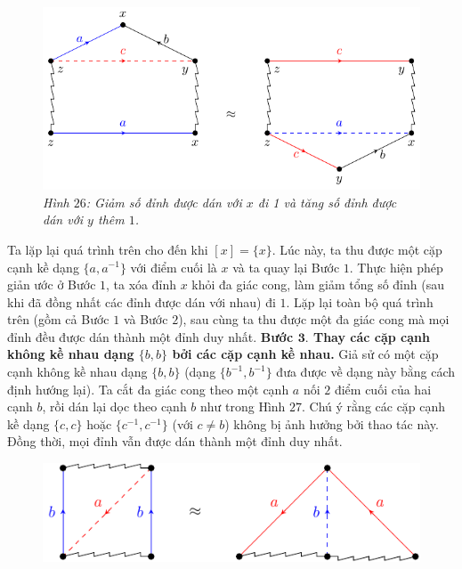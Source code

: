\begin{multicols}{2}
	\begin{figure}[H]
		\vspace*{-5pt}
		\centering\captionsetup{labelformat=empty, justification=centering}
		\includegraphics[width=1\linewidth]{H26.pdf}
		\caption{\small\textit{\color{duongvaotoanhoc}Hình $26$: Giảm số đỉnh được dán với $x$ đi 1 và tăng số đỉnh được dán với $y$ thêm $1$.}}
		\vspace*{-10pt}
	\end{figure}
	Ta lặp lại quá trình trên cho đến khi $[x] = \{x\}$. Lúc này, ta thu được một cặp cạnh kề dạng $\{a,a^{-1}\}$ với điểm cuối là $x$ và ta quay lại Bước $1$. Thực hiện phép giản ước ở Bước $1$, ta xóa đỉnh $x$ khỏi đa giác cong, làm giảm tổng số đỉnh (sau khi đã đồng nhất các đỉnh được dán với nhau) đi $1$. Lặp lại toàn bộ quá trình trên (gồm cả Bước $1$ và Bước $2$), sau cùng ta thu được một đa giác cong mà mọi đỉnh đều được dán thành một đỉnh duy nhất.
	\vskip 0.1cm
	{\bf\color{duongvaotoanhoc} Bước $\pmb{3.}$ Thay các cặp cạnh không kề nhau dạng $\{b,b\}$ bởi các cặp cạnh kề nhau.} Giả sử có một cặp cạnh không kề nhau dạng $\{b,b\}$ (dạng $\{b^{-1},b^{-1}\}$ đưa được về dạng này bằng cách định hướng lại). Ta cắt đa giác cong theo một cạnh $a$ nối $2$ điểm cuối của hai cạnh $b$, rồi dán lại dọc theo cạnh $b$ như trong Hình $27$. Chú ý rằng các cặp cạnh kề dạng $\{c,c\}$ hoặc  $\{c^{-1},c^{-1}\}$ (với $c \neq b$) không bị ảnh hưởng bởi thao tác này. Đồng thời, mọi đỉnh vẫn được dán thành một đỉnh duy nhất.
	\begin{figure}[H]
		\vspace*{-5pt}
		\centering\captionsetup{labelformat=empty, justification=centering}
		\includegraphics[width=1\linewidth]{H27.pdf}

\end{figure}
\end{multicols}
